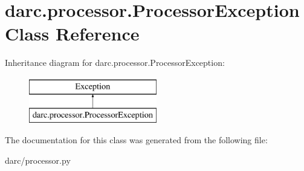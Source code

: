 \hypertarget{classdarc_1_1processor_1_1_processor_exception}{}\section{darc.\+processor.\+Processor\+Exception Class Reference}
\label{classdarc_1_1processor_1_1_processor_exception}
Inheritance diagram for darc.\+processor.\+Processor\+Exception\+:\begin{figure}[H]
\begin{center}
\leavevmode
\includegraphics[height=2.000000cm]{classdarc_1_1processor_1_1_processor_exception}
\end{center}
\end{figure}


The documentation for this class was generated from the following file\+:\begin{DoxyCompactItemize}
\item 
darc/processor.\+py\end{DoxyCompactItemize}
